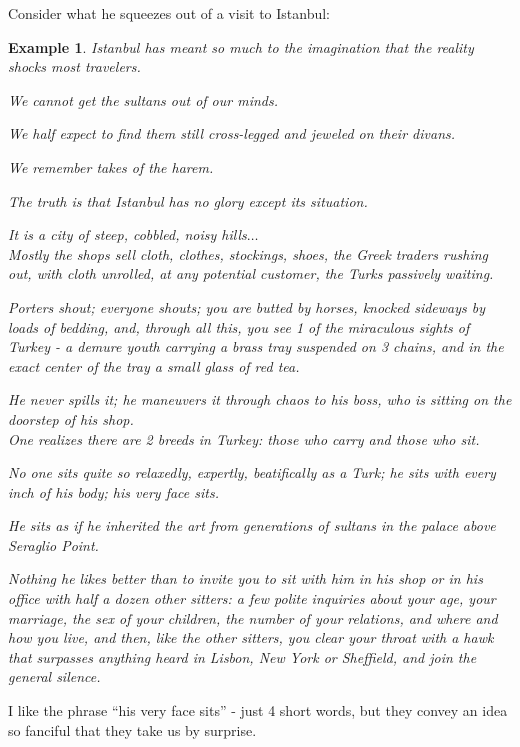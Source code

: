 \documentclass{book}
\numberwithin{equation}{section}
\newtheorem{example}{Example}[chapter]
\begin{document}
Consider what he squeezes out of a visit to Istanbul:
\begin{example}
    Istanbul has meant so much to the imagination that the reality shocks most travelers.
    
    We cannot get the sultans out of our minds.
    
    We half expect to find them still cross-legged and jeweled on their divans.
    
    We remember takes of the harem.
    
    The truth is that Istanbul has no glory except its situation.
    
    It is a city of steep, cobbled, noisy hills$\ldots$
    \\
    
    Mostly the shops sell cloth, clothes, stockings, shoes, the Greek traders rushing out, with cloth unrolled, at any potential customer, the Turks passively waiting.
    
    Porters shout; everyone shouts; you are butted by horses, knocked sideways by loads of bedding, and, through all this, you see 1 of the miraculous sights of Turkey - a demure youth carrying a brass tray suspended on 3 chains, and in the exact center of the tray a small glass of red tea.
    
    He never spills it; he maneuvers it through chaos to his boss, who is sitting on the doorstep of his shop.
    \\
    
    One realizes there are 2 breeds in Turkey: those who carry and those who sit.
    
    No one sits quite so relaxedly, expertly, beatifically as a Turk; he sits with every inch of his body; his very face sits.
    
    He sits as if he inherited the art from generations of sultans in the palace above Seraglio Point.
    
    Nothing he likes better than to invite you to sit with him in his shop or in his office with half a dozen other sitters: a few polite inquiries about your age, your marriage, the sex of your children, the number of your relations, and where and how you live, and then, like the other sitters, you clear your throat with a hawk that surpasses anything heard in Lisbon, New York or Sheffield, and join the general silence.
\end{example}
I like the phrase ``his very face sits'' - just 4 short words, but they convey an idea so fanciful that they take us by surprise.
\end{document}
